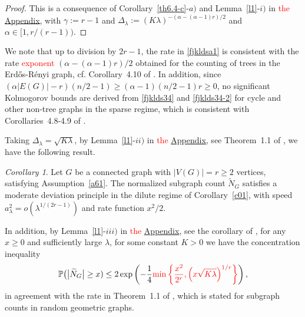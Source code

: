 \documentclass[bj,authoryear,noshowframe]{imsart}
\theoremstyle{plain}
\theoremstyle{remark}
\def\P{\mathbb{P}}
\newtheorem{corollary}[prop]{Corollary}
\begin{document}
\begin{proof}
  This is a consequence of 
  Corollary~\ref{th6.4-c}-$a)$
  and Lemma~\ref{l1}-$i)$ in \textcolor{red}{the} \hyperref[appn]{Appendix},
  with $\gamma :=r-1$ and 
  $\Delta_\lambda:=
  (K \lambda )^{ - (
 \alpha   -(\alpha - 1)r 
    )/2}$
  and $\alpha \in [1, r/(r-1) )$. 
\end{proof} 
  We note that  up to division by $2r - 1$,
   the rate in \eqref{fjkldsa1} is consistent  
 with the rate \textcolor{red}{exponent} $(
 \alpha    -(\alpha - 1)r 
     ) / 2$ obtained for the counting of trees in the
 Erd{\H o}s-R\'enyi graph, cf. Corollary~4.10 of \cite{PS2}. 
 In addition, since 
$
(\alpha |E(G)|-r)(n/2-1)
\geq
(\alpha -1)(n/2-1)r \geq 0$,
no significant Kolmogorov bounds
are derived from \eqref{fjklds34}
and \eqref{fjklds34-2} 
for cycle and other non-tree graphs 
in the sparse regime,
which is consistent with
Corollaries~4.8-4.9 of \cite{PS2}. 

\medskip

 Taking $\Delta_\lambda = \sqrt{K \lambda}$, 
 by Lemma~\ref{l1}-$ii)$ in \textcolor{red}{the} \hyperref[appn]{Appendix}, see Theorem~1.1 of \cite{doring},
we have the following result. 
\begin{corollary} %
  \label{c01-2-0}
  Let $G$ be a connected graph with $|V(G)| = r \geq 2$ vertices,
  satisfying Assumption~\ref{a61}. 
  The normalized subgraph count $\widetilde{N}_G$
    satisfies a moderate deviation principle
  in the dilute regime of Corollary~\ref{c01}, 
  with speed $a_\lambda^2 = o( \lambda^{1/(2r - 1)} )$ and rate function $x^2/2$.
\end{corollary}
In addition,
by Lemma~\ref{l1}-$iii)$ in \textcolor{red}{the} \hyperref[appn]{Appendix},
see the corollary of \cite[Lemma~2.4]{saulis},
for any $x\ge0$ and sufficiently large $\lambda$,
for some constant $K>0$ 
we have the concentration inequality 
\begin{equation}
\label{concentrationineq}
  \P \big( \big| \widetilde{N}_G \big|
  \geq x)\le2\exp\left(-
  \frac{1}{4} \textcolor{red}{\min\left\{\frac{x^2}{2^r},
   \left( x\sqrt{K \lambda}\right)^{1/r}\right\}
  }
   \right), 
\end{equation} 
in agreement with the rate in Theorem~1.1 of \cite{bachmann},
which is stated for subgraph counts in random geometric
graphs. 
\end{document}
